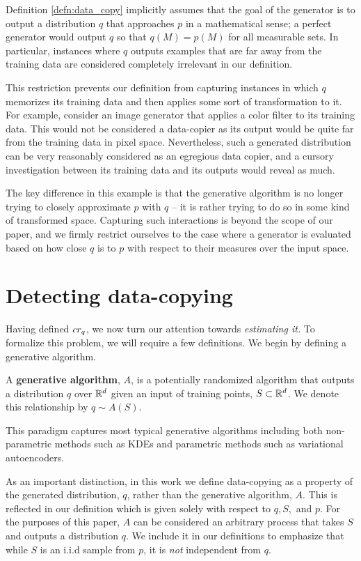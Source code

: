 Definition \ref{defn:data_copy} implicitly assumes that the goal of the generator is to output a distribution $q$ that approaches $p$ in a mathematical sense; a perfect generator would output $q$ so that $q(M) = p(M)$ for all measurable sets. In particular, instances where $q$ outputs examples that are far away from the training data are considered completely irrelevant in our definition.

This restriction prevents our definition from capturing instances in which $q$ memorizes its training data and then applies some sort of transformation to it. For example, consider an image generator that applies a color filter to its training data. This would not be considered a data-copier as its output would be quite far from the training data in pixel space. Nevertheless, such a generated distribution can be very reasonably considered as an egregious data copier, and a cursory investigation between its training data and its outputs would reveal as much. 

The key difference in this example is that the generative algorithm is no longer trying to closely approximate $p$ with $q$ -- it is rather trying to do so in some kind of transformed space. Capturing such interactions is beyond the scope of our paper, and we firmly restrict ourselves to the case where a generator is evaluated based on how close $q$ is to $p$ with respect to their measures over the input space. 

\section{Detecting data-copying}

Having defined $cr_q$, we now turn our attention towards \textit{estimating it.} To formalize this problem, we will require a few definitions. We begin by defining a generative algorithm.

\begin{definition}
A \textbf{generative algorithm}, $A$, is a potentially randomized algorithm that outputs a distribution $q$ over $\mathbb{R}^d$ given an input of training points, $S \subset \mathbb{R}^d$. We denote this relationship by $q \sim A(S)$.
\end{definition}

This paradigm captures most typical generative algorithms including both non-parametric methods such as KDEs and parametric methods such as variational autoencoders.

As an important distinction, in this work we define data-copying as a property of the generated distribution, $q$, rather than the generative algorithm, $A$. This is reflected in our definition which is given solely with respect to $q, S,$ and $p$. For the purposes of this paper, $A$ can be considered an arbitrary process that takes $S$ and outputs a distribution $q$. We include it in our definitions to emphasize that while $S$ is an i.i.d sample from $p$, it is \textit{not} independent from $q$. 

